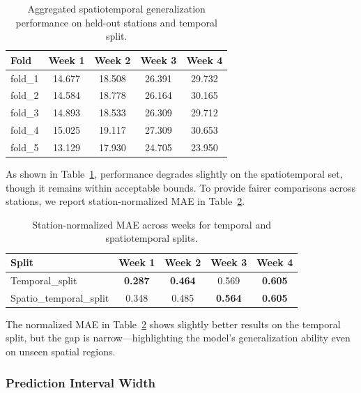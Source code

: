 \documentclass[ruler]{CUP-JNL-EDS}%
\begin{document}
\begin{table}[ht]
\centering
\begin{tabular}{lcccc}
\hline
\textbf{Fold} & \textbf{Week 1} & \textbf{Week 2} & \textbf{Week 3} & \textbf{Week 4} \\
\hline
fold\_1 & 14.677 & 18.508 & 26.391 & 29.732 \\
fold\_2 & 14.584 & 18.778 & 26.164 & 30.165 \\
fold\_3 & 14.893 & 18.533 & 26.309 & 29.712 \\
fold\_4 & 15.025 & 19.117 & 27.309 & 30.653 \\
fold\_5 & 13.129 & 17.930 & 24.705 & 23.950 \\
\hline
\end{tabular}
\caption{Aggregated spatiotemporal generalization performance on held-out stations and temporal split.}
\label{tab:spatiotemporal_generalization_aggregated}
\end{table}

\noindent As shown in Table~\ref{tab:spatiotemporal_generalization_aggregated}, performance degrades slightly on the spatiotemporal set, though it remains within acceptable bounds. To provide fairer comparisons across stations, we report station-normalized MAE in Table~\ref{tab:spatiotemporal_generalization}.

\begin{table}[ht]
\centering
\begin{tabular}{lcccc}
\hline
\textbf{Split} & \textbf{Week 1} & \textbf{Week 2} & \textbf{Week 3} & \textbf{Week 4} \\
\hline
Temporal\_split & \textbf{0.287} & \textbf{0.464} & 0.569 & \textbf{0.605} \\
Spatio\_temporal\_split & 0.348 & 0.485 & \textbf{0.564} & \textbf{0.605} \\
\hline
\end{tabular}
\caption{Station-normalized MAE across weeks for temporal and spatiotemporal splits.}
\label{tab:spatiotemporal_generalization}
\end{table}

\noindent The normalized MAE in Table~\ref{tab:spatiotemporal_generalization} shows slightly better results on the temporal split, but the gap is narrow—highlighting the model’s generalization ability even on unseen spatial regions.

\subsubsection*{Prediction Interval Width}
\end{document}

